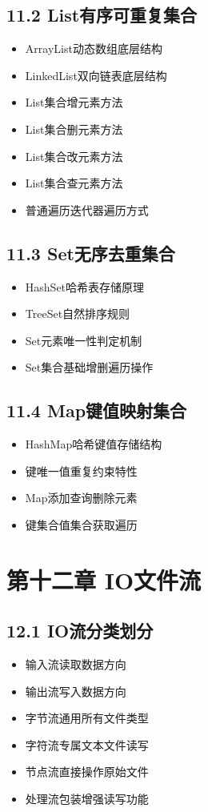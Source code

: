 \subsection{11.2 List有序可重复集合}
\begin{itemize}
\item ArrayList动态数组底层结构
\item LinkedList双向链表底层结构
\item List集合增元素方法
\item List集合删元素方法
\item List集合改元素方法
\item List集合查元素方法
\item 普通遍历迭代器遍历方式
\end{itemize}

\subsection{11.3 Set无序去重集合}
\begin{itemize}
\item HashSet哈希表存储原理
\item TreeSet自然排序规则
\item Set元素唯一性判定机制
\item Set集合基础增删遍历操作
\end{itemize}

\subsection{11.4 Map键值映射集合}
\begin{itemize}
\item HashMap哈希键值存储结构
\item 键唯一值重复约束特性
\item Map添加查询删除元素
\item 键集合值集合获取遍历
\end{itemize}

\section{第十二章 IO文件流}
\subsection{12.1 IO流分类划分}
\begin{itemize}
\item 输入流读取数据方向
\item 输出流写入数据方向
\item 字节流通用所有文件类型
\item 字符流专属文本文件读写
\item 节点流直接操作原始文件
\item 处理流包装增强读写功能
\end{itemize}

